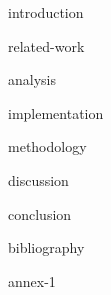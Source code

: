 \documentclass[cic,tc,english,nominata]{resources/documentclass/iiufrgs}
\begin{document}

\tableofcontents


{introduction}


{related-work}


{analysis}


{implementation}


{methodology}


{discussion}


{conclusion}


{bibliography}


\appendix

{annex-1}

\end{document}
